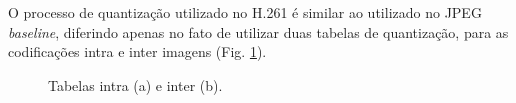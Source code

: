 O processo de quantização utilizado no H.261 é similar ao utilizado no JPEG \textit{baseline}, diferindo apenas no fato de utilizar duas tabelas de quantização, para as codificações intra e inter imagens (Fig. \ref{tabelas_mpeg}).

\begin{figure}[!ht]\label{figuras_jpeg}
\caption{Tabelas intra (a) e inter (b).}
\label{tabelas_mpeg}
\end{figure}

